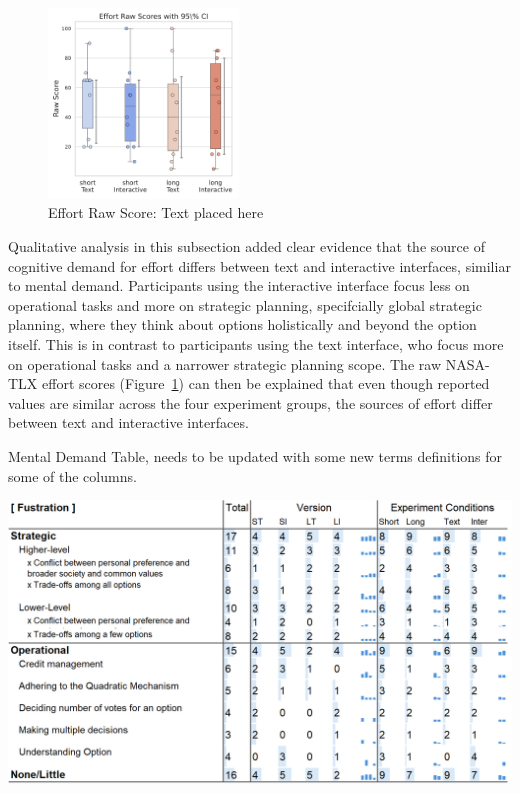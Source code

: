 \begin{figure} %
    \centering
    \includegraphics[width=0.45\textwidth, trim=0 13 0 13, clip]{content/image/cog/Effort_scores.pdf}
    \captionsetup{width=0.40\textwidth, justification=justified} %
    \caption{Effort Raw Score: Text placed here}
    \label{fig:effort_cog_score}
\end{figure}

Qualitative analysis in this subsection added clear evidence that the source of cognitive demand for effort differs between text and interactive interfaces, similiar to mental demand. Participants using the interactive interface focus less on operational tasks and more on strategic planning, specifcially global strategic planning, where they think about options holistically and beyond the option itself. This is in contrast to participants using the text interface, who focus more on operational tasks and a narrower strategic planning scope. The raw NASA-TLX effort scores (Figure~\ref{fig:effort_cog_score}) can then be explained that even though reported values are similar across the four experiment groups, the sources of effort differ between text and interactive interfaces.

\begin{table}[h]
    \caption{Mental Demand Table, needs to be updated with some new terms definitions for some of the columns.}
    \label{tbl:fustration}
    \includegraphics[width=\linewidth]{content/image/cog/fustration_table.png}
\end{table}
